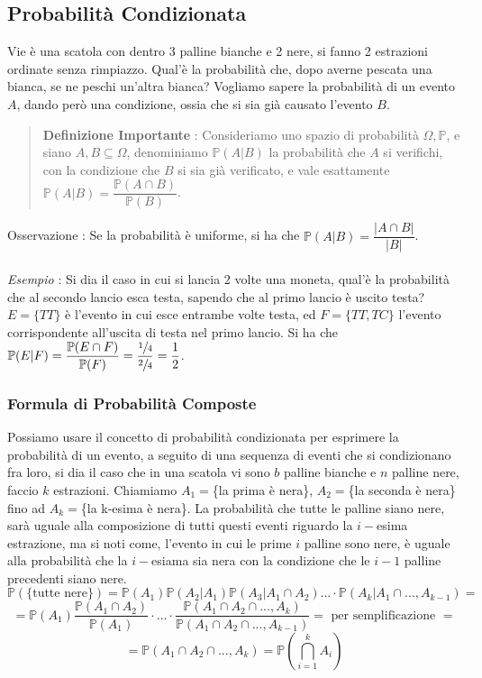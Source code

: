 \documentclass[12pt, letterpaper]{article}
\begin{document}
\subsection{Probabilità Condizionata}
Vie è una scatola con dentro 3 palline bianche e 2 nere, si fanno 2 estrazioni ordinate 
senza rimpiazzo. Qual'è la probabilità che, dopo averne pescata una bianca, se ne peschi un'altra bianca?
Vogliamo sapere la probabilità di un evento \(A\), dando però una condizione, ossia che 
si sia già causato l'evento \(B\). \begin{quote}\textbf{Definizione Importante} : 
    Consideriamo uno spazio di probabilità \(\Omega, \mathbb{P}\), e siano \(A,B\subseteq \Omega\), 
    denominiamo  \(\mathbb{P}(A|B)\) la probabilità che \(A\) si verifichi, con la condizione che 
    \(B\) si sia già verificato, e vale esattamente \(\mathbb{P}(A|B)=\dfrac{\mathbb{P}(A\cap B)}{\mathbb{P}(B)}\). 
\end{quote}
Osservazione : Se la probabilità è uniforme, si ha che  \(\mathbb{P}(A|B)=\dfrac{|A\cap B|}{|B|}\). \\
\hphantom{}\\\textit{Esempio} : Si dia il caso in cui si lancia 2 volte una moneta, qual'è la probabilità che al secondo lancio esca testa, 
sapendo che al primo lancio è uscito testa? \(E=\{TT\}\) è 
l'evento in cui esce entrambe volte testa, ed \(F=\{TT,TC\}\) l'evento corrispondente all'uscita 
di testa nel primo lancio. Si ha che \(\mathbb{P}(E|F)=\dfrac{\mathbb{P}(E\cap F)}{\mathbb{P}(F)}=\dfrac{\sfrac{1}{4}}{\sfrac{2}{4}}=\dfrac{1}{2}\).
\subsubsection{Formula di Probabilità Composte}
Possiamo usare il concetto di probabilità condizionata per esprimere la probabilità di un evento, a seguito 
di una sequenza di eventi che si condizionano fra loro, si dia il caso che in una scatola vi sono \(b\) 
palline bianche e \(n\) palline nere, faccio \(k\) estrazioni. Chiamiamo \(A_1=\)\{la prima è nera\}, 
\(A_2=\)\{la seconda è nera\} fino ad \(A_k=\)\{la k-esima è nera\}. La probabilità che tutte le palline siano 
nere, sarà uguale alla composizione di tutti questi eventi riguardo la \(i-\)esima estrazione, ma si noti come, 
l'evento in cui le prime \(i\) palline sono nere, è uguale alla probabilità che la \(i-\)esiama sia nera 
con la condizione che le \(i-1\) palline precedenti siano nere.\begin{equation}
    \mathbb{P}(\{\text{tutte nere}\})=\mathbb{P}(A_1)\mathbb{P}(A_2|A_1)\mathbb{P}(A_3|A_1\cap A_2)...\cdot\mathbb{P}(A_k|A_1\cap...,A_{k-1})=
\end{equation}\begin{equation}
    =\mathbb{P}(A_1)\dfrac{\mathbb{P}(A_1\cap A_2)}{\mathbb{P}(A_1)}\cdot...\cdot\dfrac{\mathbb{P}(A_1\cap A_2\cap...,A_{k})}{\mathbb{P}(A_1\cap A_2\cap...,A_{k-1})}=\text{ per semplificazione }=
\end{equation}
\begin{equation}
    =\mathbb{P}(A_1\cap A_2\cap...,A_{k})=\mathbb{P}(\bigcap_{i=1}^kA_i) 
\end{equation}
\end{document}
